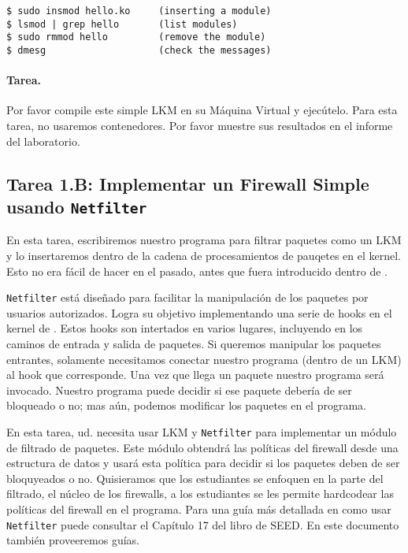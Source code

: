 \begin{lstlisting}
$ sudo insmod hello.ko     (inserting a module)
$ lsmod | grep hello       (list modules)
$ sudo rmmod hello         (remove the module)
$ dmesg                    (check the messages)
\end{lstlisting}


\paragraph{Tarea.} Por favor compile este simple LKM en su Máquina Virtual y ejecútelo. Para esta tarea, no usaremos contenedores. Por favor muestre sus resultados en el informe del laboratorio.


\subsection{Tarea 1.B: Implementar un Firewall Simple usando \texttt{Netfilter}}  

En esta tarea, escribiremos nuestro programa para filtrar paquetes como un LKM y lo insertaremos dentro de la cadena de procesamientos de pauqetes en el kernel. Esto no era fácil de hacer en el pasado, antes que \netfilter fuera introducido dentro de \linux.

{\tt Netfilter} está diseñado para facilitar la manipulación de los paquetes por usuarios autorizados. Logra su objetivo implementando una serie de hooks en el kernel de \linux. Estos hooks son intertados en varios lugares, incluyendo en los caminos de entrada y salida de paquetes.
Si queremos manipular los paquetes entrantes, solamente necesitamos conectar nuestro programa (dentro de un LKM) al hook que corresponde. Una vez que llega un paquete nuestro programa será invocado. Nuestro programa puede decidir si ese paquete debería de ser bloqueado o no; mas aún, podemos modificar los paquetes en el programa.

En esta tarea, ud. necesita usar LKM y {\tt Netfilter} para implementar un módulo de filtrado de paquetes. Este módulo obtendrá las políticas del firewall desde una estructura de datos y usará esta política para decidir si los paquetes deben de ser bloquyeados o no.
Quisieramos que los estudiantes se enfoquen en la parte del filtrado, el núcleo de los firewalls, a los estudiantes se les permite hardcodear las políticas del firewall en el programa. Para una guía más detallada en como usar \texttt{Netfilter} puede consultar el Capítulo 17 del libro de SEED. 
En este documento también proveeremos guías.


